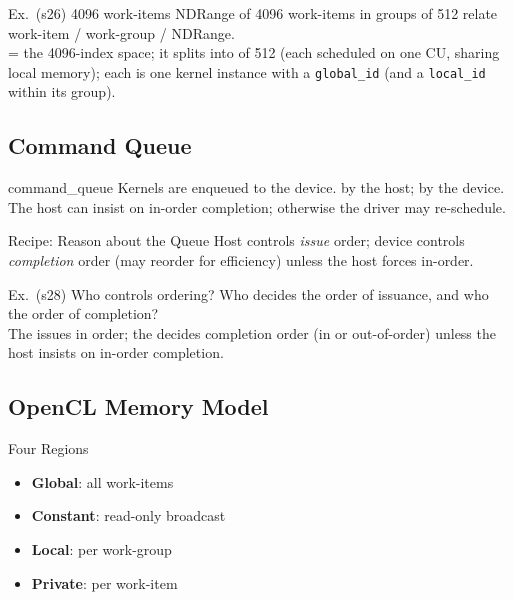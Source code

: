 \begin{example2}{Ex.\ (s26) 4096 work-items}
    NDRange of 4096 work-items in groups of 512 relate work-item / work-group / NDRange.
     \\ 
     = the 4096-index space; it splits into  of 512 (each scheduled on one CU, sharing local memory); each  is one kernel instance with a \texttt{global\_id} (and a \texttt{local\_id} within its group).
\end{example2}

\subsection{Command Queue}

\begin{definition}{command\_queue}
    Kernels are enqueued to the device.  by the host;  by the device. The host can insist on in-order completion; otherwise the driver may re-schedule.
\end{definition}

\begin{KR}{Recipe: Reason about the Queue}
    Host controls \emph{issue} order; device controls \emph{completion} order (may reorder for efficiency) unless the host forces in-order.
\end{KR}

\begin{example2}{Ex.\ (s28) Who controls ordering?}
    Who decides the order of issuance, and who the order of completion?
     \\ 
    The  issues in order; the  decides completion order (in or out-of-order) unless the host insists on in-order completion.
\end{example2}

\subsection{OpenCL Memory Model}


\begin{definition}{Four Regions}
    \begin{itemize}
        \item \textbf{Global}: all work-items
        \item \textbf{Constant}: read-only broadcast
        \item \textbf{Local}: per work-group
        \item \textbf{Private}: per work-item
    \end{itemize}
\end{definition}


